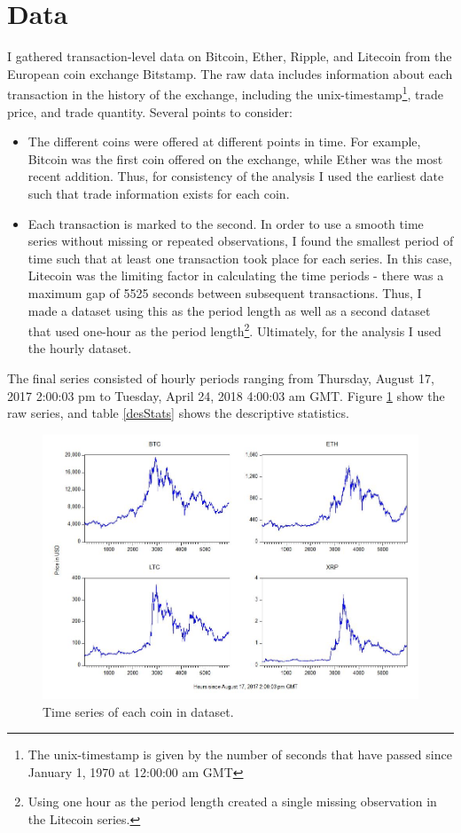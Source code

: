 \documentclass{article}
\begin{document}
	\section{Data}
	I gathered transaction-level data on Bitcoin, Ether, Ripple, and Litecoin from the European coin exchange Bitstamp. The raw data includes information about each transaction in the history of the exchange, including the unix-timestamp\footnote{The unix-timestamp is given by the number of seconds that have passed since January 1, 1970 at 12:00:00 am GMT}, trade price, and trade quantity. Several points to consider: 
	\begin{itemize}
		\item The different coins were offered at different points in time. For example, Bitcoin was the first coin offered on the exchange, while Ether was the most recent addition. Thus, for consistency of the analysis I used the earliest date such that trade information exists for each coin. 
		\item Each transaction is marked to the second. In order to use a smooth time series without missing or repeated observations, I found the smallest period of time such that at least one transaction took place for each series. In this case, Litecoin was the limiting factor in calculating the time periods - there was a maximum gap of 5525 seconds between subsequent transactions. Thus, I made a dataset using this as the period length as well as a second dataset that used one-hour as the period length\footnote{Using one hour as the period length created a single missing observation in the Litecoin series.}. Ultimately, for the analysis I used the hourly dataset. 
	\end{itemize}
	
	The final series consisted of hourly periods ranging from Thursday, August 17, 2017 2:00:03 pm to Tuesday, April 24, 2018 4:00:03 am GMT. Figure \ref{allGraphs} show the raw series, and table \ref{desStats} shows the descriptive statistics.

	\begin{figure}[H]
		\centering
		\includegraphics[width = .75\textwidth]{AllCoins_graph.jpg}
		\caption{Time series of each coin in dataset.}
		\label{allGraphs}
	\end{figure}
	
\end{document}
